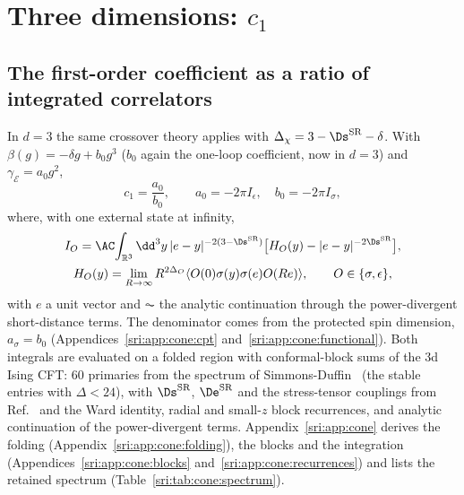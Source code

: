 \section{Three dimensions: \texorpdfstring{$c_1$}{c1}}\label{sri:sec:d3}
\subsection{The first-order coefficient as a ratio of integrated correlators}
In $d=3$ the same crossover theory applies with $\Delta_\chi=3-\Ds^{\rm SR}-\delta$. With
$\beta(g)=-\delta g+b_0g^3$ ($b_0$ again the one-loop coefficient, now in $d=3$) and $\gamma_{\mathcal E}=a_0g^2$,
\begin{equation}
 c_1=\frac{a_0}{b_0},\qquad a_0=-2\pi I_\epsilon,\quad b_0=-2\pi I_\sigma,
\end{equation}
where, with one external state at infinity,
\begin{equation}
\begin{gathered}
 I_O=\AC\!\int_{\mathbb R^3}\dd^3y\,|e-y|^{-2(3-\Ds^{\rm SR})}\bigl[H_O(y)-|e-y|^{-2\Ds^{\rm SR}}\bigr],\\
 H_O(y)=\lim_{R\to\infty}R^{2\Delta_O}\langle O(0)\sigma(y)\sigma(e)O(Re)\rangle,\qquad O\in\{\sigma,\epsilon\},
\end{gathered}
\end{equation}
with $e$ a unit vector and $\AC$ the analytic continuation through the power-divergent short-distance terms. The
denominator comes from the protected spin dimension, $a_\sigma=b_0$ (Appendices~\ref{sri:app:cone:cpt}
and~\ref{sri:app:cone:functional}). Both integrals are evaluated on a folded
region with conformal-block sums of the 3d Ising CFT: 60 primaries from the spectrum of
Simmons-Duffin~\cite{sri:Simmons-Duffin:2016wlq} (the stable entries with $\Delta<24$), with $\Ds^{\rm SR}$, $\De^{\rm SR}$
and the stress-tensor couplings from Ref.~\cite{sri:Chang:2024whx} and the Ward identity, radial and small-$z$ block
recurrences, and analytic continuation of the power-divergent terms. Appendix~\ref{sri:app:cone} derives the folding
(Appendix~\ref{sri:app:cone:folding}), the blocks and the integration (Appendices~\ref{sri:app:cone:blocks}
and~\ref{sri:app:cone:recurrences}) and lists the retained spectrum (Table~\ref{sri:tab:cone:spectrum}).

